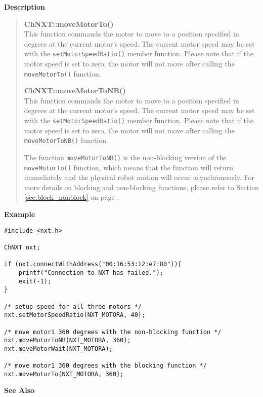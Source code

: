 \noindent
{\bf Description}\\
\vspace{-12pt}
\begin{quote}
{\bf ChNXT::moveMotorTo()}\\
This function commands the motor to move to a position specified 
in degrees at the current motor's speed. The current motor speed 
may be set with the \texttt{setMotorSpeedRatio()} member function.
Please note that if the motor speed is set to zero, the motor will
not move after calling the \texttt{moveMotorTo()} function. 

{\bf ChNXT::moveMotorToNB()}\\
This function commands the motor to move to a position specified 
in degrees at the current motor's speed. The current motor speed 
may be set with the \texttt{setMotorSpeedRatio()} member function.
Please note that if the motor speed is set to zero, the motor will
not move after calling the \texttt{moveMotorToNB()} function. 

The function \texttt{moveMotorToNB()} is the non-blocking version 
of the \texttt{moveMotorTo()} function, which means that the 
function will return immediately and the physical robot motion 
will occur asynchronously. For more details on blocking and 
non-blocking functions, please refer to Section \ref{sec:block_nonblock}
on page \pageref{sec:block_nonblock}.\\
\end{quote}

\noindent
{\bf Example}
\begin{lstlisting}
#include <nxt.h> 

ChNXT nxt;

if (nxt.connectWithAddress("00:16:53:12:e7:80")){
    printf("Connection to NXT has failed.");
    exit(-1);
}
 
/* setup speed for all three motors */
nxt.setMotorSpeedRatio(NXT_MOTORA, 40);

/* move motor1 360 degrees with the non-blocking function */
nxt.moveMotorToNB(NXT_MOTORA, 360);
nxt.moveMotorWait(NXT_MOTORA);

/* move motor1 360 degrees with the blocking function */
nxt.moveMotorTo(NXT_MOTORA, 360);
\end{lstlisting}

\noindent
{\bf See Also}\\
